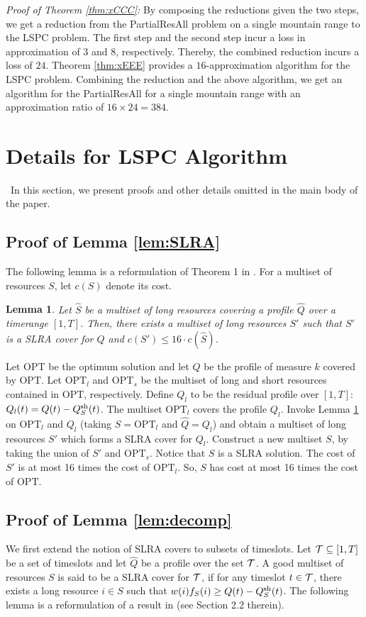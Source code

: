 \documentclass[11pt]{article}
\newtheorem{lemma}[theorem]{Lemma}
\newcommand{\opt}{{\mathrm{OPT}}}
\newcommand{\PResAll}{{\sc PartialResAll}}
\newcommand{\lspc}{{\sc LSPC}}
\newcommand{\sh} {{\rm sh}}
\newcommand{\calT} {{\cal T}}
\newcommand{\wh}[1] {\widehat{#1}}
\begin{document}
\noindent
{\it Proof of Theorem \ref{thm:xCCC}: }
By composing the reductions given the two steps,
we get a reduction from the {\PResAll} problem on a single mountain range to the {\lspc} problem. 
The first step and the second step incur a loss in approximation of $3$ and $8$, respectively.
Thereby, the combined reduction incurs a loss of $24$.
Theorem \ref{thm:xEEE} provides a $16$-approximation algorithm for the {\lspc} problem.
Combining the reduction and the above algorithm, we get an algorithm for the {\PResAll} for a single mountain
range with an approximation ratio of $16\times 24 = 384$.

\section{Details for {\lspc} Algorithm}
\label{sec:lspcdetails}\
In this section, we present proofs and other details omitted in the main body of the paper.

\subsection{Proof of Lemma \ref{lem:SLRA}}
The following lemma is a reformulation of Theorem 1 {in} \cite{esa2011}.
For a multiset of resources $S$, let $c(S)$ denote its cost.
\begin{lemma}
\label{lem:esa-SLRA}
Let $\wh{S}$ be a multiset of long resources covering a profile $\wh{Q}$ over a timerange $[1,T]$.
Then, there exists a multiset of long resources $S'$ such that $S'$ is a SLRA cover for $Q$
and $c(S')\leq 16\cdot c(\wh{S})$. 
\end{lemma}

Let $\opt$ be the optimum solution and let $Q$ be the profile of measure $k$ covered by $\opt$.
Let $\opt_l$ and $\opt_s$ be the multiset of long and short resources contained in $\opt$, respectively.
Define $Q_l$ to be the residual profile over $[1,T]$: $Q_l(t)=Q(t)- Q^{\sh}_S(t)$.
The multiset $\opt_l$ covers the profile $Q_l$. 
Invoke Lemma \ref{lem:esa-SLRA} on $\opt_l$ and $Q_l$ (taking $\wh{S}=\opt_l$ and $\wh{Q}=Q_l$)
and obtain a multiset of long resources $S'$ which forms a SLRA cover for $Q_l$. 
Construct a new multiset $S$, by taking the union of $S'$ and $\opt_s$. 
Notice that $S$ is a SLRA solution.  The cost  of $S'$ is at most 16 times the cost of $\opt_l$.
So, $S$ has cost at most 16 times the cost of $\opt$.


\subsection{Proof of Lemma \ref{lem:decomp}}
We first extend the notion of SLRA covers to subsets of timeslots.
Let $\calT\subseteq [1,T]$ be a set of timeslots and let $\wh{Q}$ be a profile over the set $\calT$.
A good multiset of resources $S$ is said to be a SLRA cover for $\calT$, 
if for any timeslot $t\in \calT$, there exists a long resource $i\in S$ such that 
$w(i)f_{S}(i)\geq Q(t)-Q^{\sh}_{S}(t)$.
The following lemma is a reformulation of a result in \cite{esa2011} (see Section 2.2 therein).
\end{document}
